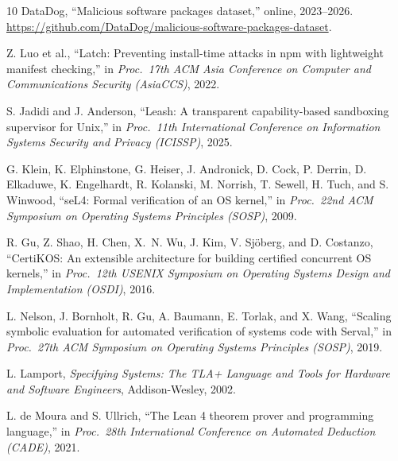 \documentclass[letterpaper,twocolumn,10pt]{article}
\begin{document}
\begin{thebibliography}{10}
DataDog,
``Malicious software packages dataset,''
online, 2023--2026. \url{https://github.com/DataDog/malicious-software-packages-dataset}.

Z. Luo et al.,
``Latch: Preventing install-time attacks in npm with lightweight manifest checking,''
in \emph{Proc.\ 17th ACM Asia Conference on Computer and Communications Security (AsiaCCS)}, 2022.

S. Jadidi and J. Anderson,
``Leash: A transparent capability-based sandboxing supervisor for Unix,''
in \emph{Proc.\ 11th International Conference on Information Systems Security and Privacy (ICISSP)}, 2025.

G. Klein, K. Elphinstone, G. Heiser, J. Andronick, D. Cock, P. Derrin,
D. Elkaduwe, K. Engelhardt, R. Kolanski, M. Norrish, T. Sewell,
H. Tuch, and S. Winwood,
``seL4: Formal verification of an OS kernel,''
in \emph{Proc.\ 22nd ACM Symposium on Operating Systems Principles (SOSP)}, 2009.

R. Gu, Z. Shao, H. Chen, X.~N. Wu, J. Kim, V. Sj\"oberg, and D. Costanzo,
``CertiKOS: An extensible architecture for building certified concurrent OS kernels,''
in \emph{Proc.\ 12th USENIX Symposium on Operating Systems Design and Implementation (OSDI)}, 2016.

L. Nelson, J. Bornholt, R. Gu, A. Baumann, E. Torlak, and X. Wang,
``Scaling symbolic evaluation for automated verification of systems code with Serval,''
in \emph{Proc.\ 27th ACM Symposium on Operating Systems Principles (SOSP)}, 2019.

L. Lamport,
\emph{Specifying Systems: The TLA+ Language and Tools for Hardware and Software Engineers},
Addison-Wesley, 2002.

L. de Moura and S. Ullrich,
``The Lean 4 theorem prover and programming language,''
in \emph{Proc.\ 28th International Conference on Automated Deduction (CADE)}, 2021.

\end{thebibliography}
\end{document}
